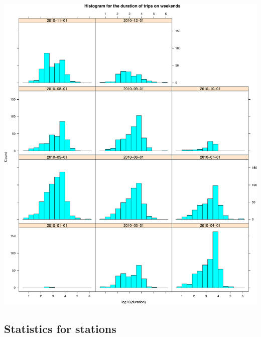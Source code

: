 \documentclass[]{article}
\begin{document}
\includegraphics{velopassBirdsEye_files/figure-latex/tripdurations-3.pdf}

\subsection{Statistics for stations}\label{statistics-for-stations}
\end{document}
